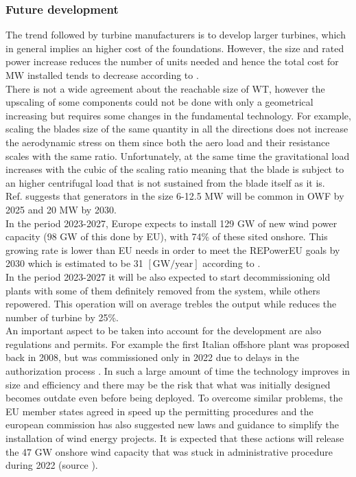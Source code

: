 \subsubsection{Future development}
The trend followed by turbine manufacturers is to develop larger turbines, which in general implies an higher cost of the foundations. However, the size and rated power increase reduces the number of units needed and hence the total cost for $\si{\mega\watt}$ installed tends to decrease according to \cite{current_staus_and_future_trends_of_offshore_wind_power_in_europe}.\\
There is not a wide agreement about the reachable size of WT, however the upscaling of some components could not be done with only a geometrical increasing but requires some changes in the fundamental technology. For example, scaling the blades size of the same quantity in all the directions does not increase the aerodynamic stress on them since both the aero load and their resistance scales with the same ratio. Unfortunately, at the same time the gravitational load increases with the cubic of the scaling ratio meaning that the blade is subject to an higher centrifugal load that is not sustained from the blade itself as it is. \\
Ref. \cite{current_staus_and_future_trends_of_offshore_wind_power_in_europe} suggests that generators in the size 6-12.5 $\si{\mega\watt}$ will be common in OWF by 2025 and 20 $\si{\mega\watt}$ by 2030.\\
In the period 2023-2027, Europe expects to install 129 $\si{\giga\watt}$ of new wind power capacity (98 $\si{\giga\watt}$ of this done by EU), with 74\% of these sited onshore. This growing rate is lower than EU needs in order to meet the REPowerEU goals by 2030 which is estimated to be 31 $\left[\text{GW/year}\right]$ according to \cite{wind_europe_data_2022}. \\
In the period 2023-2027 it will be also expected to start decommissioning old plants with some of them definitely removed from the system, while others repowered. This operation will on average trebles the output while reduces the number of turbine by 25\%. \\
An important aspect to be taken into account for the development are also regulations and permits. For example the first Italian offshore plant was proposed back in 2008, but was commissioned only in 2022 due to delays in the authorization process \cite{il_post}. In such a large amount of time the technology improves in size and efficiency and there may be the risk that what was initially designed becomes outdate even before being deployed. To overcome similar problems, the EU member states agreed in speed up the permitting procedures and the european commission has also suggested new laws and guidance to simplify the installation of wind energy projects. It is expected that these actions will release the 47 $\si{\giga\watt}$ onshore wind capacity that was stuck in administrative procedure during 2022 (source \cite{wind_europe_data_2022}).  